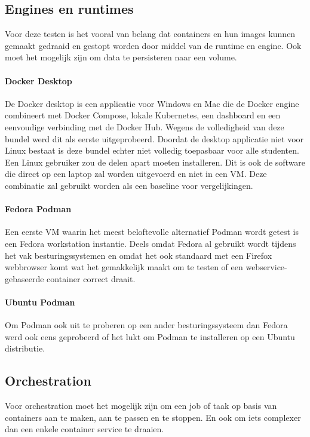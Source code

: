 \subsection{Engines en runtimes}
Voor deze testen is het vooral van belang dat containers en hun images kunnen gemaakt gedraaid en gestopt worden door middel van de runtime en engine. Ook moet het mogelijk zijn om data te persisteren naar een volume.

\paragraph{Docker Desktop}
De Docker desktop is een applicatie voor Windows en Mac die de Docker engine combineert met Docker Compose, lokale Kubernetes, een dashboard en een eenvoudige verbinding met de Docker Hub. Wegens de volledigheid van deze bundel werd dit als eerste uitgeprobeerd. Doordat de desktop applicatie niet voor Linux bestaat is deze bundel echter niet volledig toepasbaar voor alle studenten. Een Linux gebruiker zou de delen apart moeten installeren. Dit is ook de software die direct op een laptop zal worden uitgevoerd en niet in een VM. Deze combinatie zal gebruikt worden als een baseline voor vergelijkingen. 

\paragraph{Fedora Podman}
Een eerste VM waarin het meest beloftevolle alternatief Podman wordt getest is een Fedora workstation instantie. Deels omdat Fedora al gebruikt wordt tijdens het vak besturingssystemen en omdat het ook standaard met een Firefox webbrowser komt wat het gemakkelijk maakt om te testen of een webservice-gebaseerde container correct draait.

\paragraph{Ubuntu Podman}
Om Podman ook uit te proberen op een ander besturingssysteem dan Fedora werd ook eens geprobeerd of het lukt om Podman te installeren op een Ubuntu distributie.

\subsection{Orchestration}
Voor orchestration moet het mogelijk zijn om een job of taak op basis van containers aan te maken, aan te passen en te stoppen. En ook om iets complexer dan een enkele container service te draaien.

